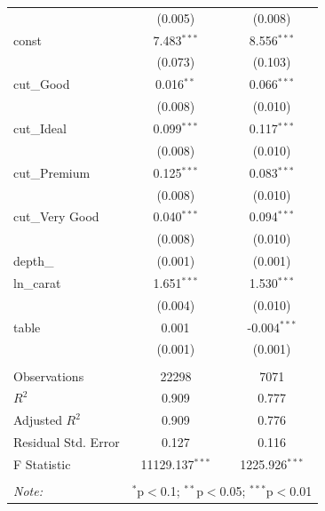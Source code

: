 \begin{table}[!htbp]
\begin{tabular}{@{\extracolsep{5pt}}lcc}
& (0.005) & (0.008) \\
 const & 7.483$^{***}$ & 8.556$^{***}$ \\
& (0.073) & (0.103) \\
 cut_Good & 0.016$^{**}$ & 0.066$^{***}$ \\
& (0.008) & (0.010) \\
 cut_Ideal & 0.099$^{***}$ & 0.117$^{***}$ \\
& (0.008) & (0.010) \\
 cut_Premium & 0.125$^{***}$ & 0.083$^{***}$ \\
& (0.008) & (0.010) \\
 cut_Very Good & 0.040$^{***}$ & 0.094$^{***}$ \\
& (0.008) & (0.010) \\
 depth_%
& (0.001) & (0.001) \\
 ln_carat & 1.651$^{***}$ & 1.530$^{***}$ \\
& (0.004) & (0.010) \\
 table & 0.001$^{}$ & -0.004$^{***}$ \\
& (0.001) & (0.001) \\
\hline \\[-1.8ex]
 Observations & 22298 & 7071 \\
 $R^2$ & 0.909 & 0.777 \\
 Adjusted $R^2$ & 0.909 & 0.776 \\
 Residual Std. Error & 0.127 & 0.116 \\
 F Statistic & 11129.137$^{***}$ & 1225.926$^{***}$ \\
\hline
\hline \\[-1.8ex]
\textit{Note:} & \multicolumn{2}{r}{$^{*}$p$<$0.1; $^{**}$p$<$0.05; $^{***}$p$<$0.01} \\
\end{tabular}
\end{table}